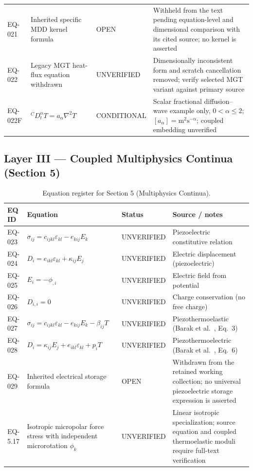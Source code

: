 \begin{table}[htbp]
\begin{tabularx}{\textwidth}{@{}p{1.6cm}Y p{2.8cm}Y@{}}
EQ-021 & Inherited specific MDD kernel formula & OPEN & Withheld from the text pending equation-level and dimensional comparison with its cited source; no kernel is asserted \\
EQ-022 & Legacy MGT heat-flux equation withdrawn & UNVERIFIED & Dimensionally inconsistent form and scratch cancellation removed; verify selected MGT variant against primary source \\
EQ-022F & ${}^C D_t^\alpha T = a_\alpha\nabla^2T$ & CONDITIONAL & Scalar fractional diffusion--wave example only, $0<\alpha\leq2$; $[a_\alpha]=\mathrm{m^2s^{-\alpha}}$; coupled embedding unverified \\
\bottomrule
\end{tabularx}
\end{table}

\subsection{Layer III — Coupled Multiphysics Continua (Section 5)}

\begin{table}[htbp]
\centering
\small
\setlength{\tabcolsep}{3pt}
\caption{Equation register for Section 5 (Multiphysics Continua).}
\label{tab:appA-sec5}
\begin{tabularx}{\textwidth}{@{}p{1.6cm}Y p{2.8cm}Y@{}}
\toprule
\textbf{EQ ID} & \textbf{Equation} & \textbf{Status} & \textbf{Source / notes} \\
\midrule
EQ-023 & $\sigma_{ij} = c_{ijkl}\varepsilon_{kl} - e_{kij}E_k$ & UNVERIFIED & Piezoelectric constitutive relation \\
EQ-024 & $D_i = e_{ikl}\varepsilon_{kl} + \kappa_{ij}E_j$ & UNVERIFIED & Electric displacement (piezoelectric) \\
EQ-025 & $E_i = -\phi_{,i}$ & UNVERIFIED & Electric field from potential \\
EQ-026 & $D_{i,i} = 0$ & UNVERIFIED & Charge conservation (no free charge) \\
EQ-027 & $\sigma_{ij} = c_{ijkl}\varepsilon_{kl} - e_{kij}E_k - \beta_{ij}T$ & UNVERIFIED & Piezothermoelastic (Barak et al.~\cite{Barak2023}, Eq.~3) \\
EQ-028 & $D_i = \kappa_{ij}E_j + e_{ikl}\varepsilon_{kl} + p_i T$ & UNVERIFIED & Piezothermoelectric (Barak et al.~\cite{Barak2023}, Eq.~6) \\
EQ-029 & Inherited electrical storage formula & OPEN & Withdrawn from the retained working collection; no universal piezoelectric storage expression is asserted \\
EQ-5.17 & Isotropic micropolar force stress with independent microrotation $\phi_k$ & UNVERIFIED & Linear isotropic specialization; source equation and coupled thermoelastic moduli require full-text verification \\
\bottomrule
\end{tabularx}
\end{table}

